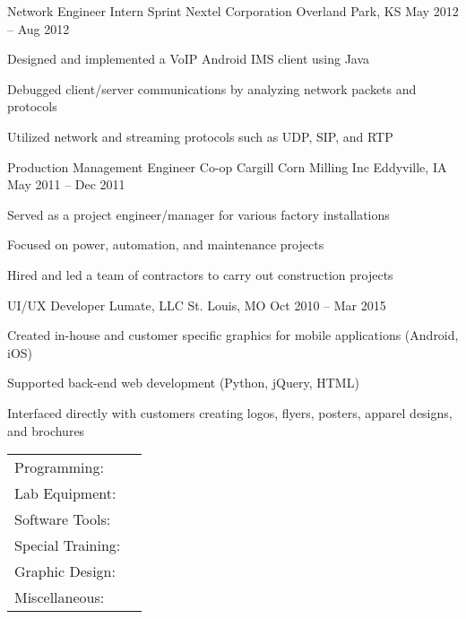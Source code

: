 \documentclass[]{awesome-cv}
\begin{document}
\begin{cventries}
	\cventry
	{Network Engineer Intern}
	{Sprint Nextel Corporation}
	{Overland Park, KS}
	{May 2012 – Aug 2012}
	{\begin{cvitems}
		\item {Designed and implemented a VoIP Android IMS client using Java}
		\item {Debugged client/server communications by analyzing network packets and protocols}
		\item {Utilized network and streaming protocols such as UDP, SIP, and RTP}
		\end{cvitems}}
	\cventry
	{Production Management Engineer Co-op}
	{Cargill Corn Milling Inc}
	{Eddyville, IA}
	{May 2011 – Dec 2011}
	{\begin{cvitems}
		\item {Served as a project engineer/manager for various factory installations}
		\item {Focused on power, automation, and maintenance projects}
		\item {Hired and led a team of contractors to carry out construction projects}
		\end{cvitems}}
	\cventry
	{UI/UX Developer}
	{Lumate, LLC}
	{St. Louis, MO}
	{Oct 2010 – Mar 2015}
	{\begin{cvitems}
		\item {Created in-house and customer specific graphics for mobile applications (Android, iOS)}
		\item {Supported back-end web development (Python, jQuery, HTML)}
		\item {Interfaced directly with customers creating logos, flyers, posters, apparel designs, and brochures}
		\end{cvitems}}
\end{cventries}
\vspace{40mm}
\begin{cventries}
	\cventry
	{}
	{\def\arraystretch{1.15}{\begin{tabular}{ l l}
		Programming:  & {\skill{ VB.NET, Python, Java, MATLAB, Arduino, Github, Subversion, TestStand, ADB, VISA, PowerShell}} \\
		Lab Equipment:  & {\skill{ Oscilloscopes, multimeters, network analyzers, power supplies, Raspberry Pi, Arduino, PXI}} \\
		Software Tools:  & {\skill{ Schematic capture, PCB layout, Mentor Graphics, CADSTAR, OrCad, SPICE, Solidworks}} \\
		Special Training:  & {\skill{ Advanced GNSS/GPS, Radar Systems Certificate, MIL-STD 1553}} \\
		Graphic Design:  & {\skill{ Adobe Photoshop, Adobe Illustrator, LaTeX, HTML, Bootstrap}} \\
		Miscellaneous:  & {\skill{ MS Office, Android, Linux, Windows, Atlassian suite}} \\
		\end{tabular}}}
	{}
	{}
	{}
\end{cventries}
\end{document}
